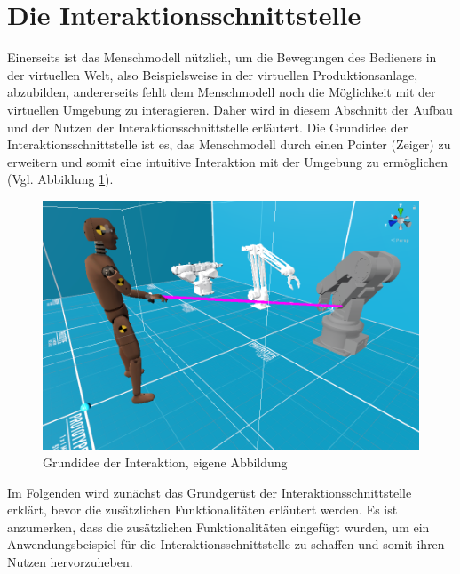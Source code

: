 \section{Die Interaktionsschnittstelle}\label{sec:DieInteraktionsschnittstelle}
Einerseits ist das Menschmodell nützlich, um die Bewegungen des Bedieners in der virtuellen Welt, also Beispielsweise in der virtuellen Produktionsanlage, abzubilden, andererseits fehlt dem Menschmodell noch die Möglichkeit mit der virtuellen Umgebung zu interagieren. Daher wird in diesem Abschnitt der Aufbau und der Nutzen der Interaktionsschnittstelle erläutert. Die Grundidee der Interaktionsschnittstelle ist es, das Menschmodell durch einen Pointer (Zeiger) zu erweitern und somit eine intuitive Interaktion mit der Umgebung zu ermöglichen (Vgl. Abbildung \ref{fig:InteraktionBeispiel}).
\begin{figure}[h]
	\centering
	\includegraphics[width=0.6\linewidth]{Bilder/A44_InteraktionsBeispiel}
	\caption{Grundidee der Interaktion, eigene Abbildung}
	\label{fig:InteraktionBeispiel}
\end{figure}
\newline
\noindent Im Folgenden wird zunächst das Grundgerüst der Interaktionsschnittstelle erklärt, bevor die zusätzlichen Funktionalitäten erläutert werden. Es ist anzumerken, dass die zusätzlichen Funktionalitäten eingefügt wurden, um ein Anwendungsbeispiel für die Interaktionsschnittstelle zu schaffen und somit ihren Nutzen hervorzuheben.

